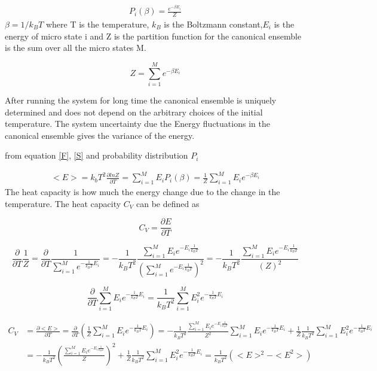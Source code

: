 \documentclass[10pt,a4paper]{article}
\begin{document}
\begin{align}
P_i (\beta) =\frac{ e^{- \beta E_i}}{Z}
\end{align} 
$\beta = 1/k_B T$ where T is the temperature, $k_B$ is the Boltzmann constant,$E_i$ is the energy of micro state i and Z is the partition function for the canonical ensemble is the sum over all the micro states M.

\begin{equation}
  Z=\sum_{i=1}^{M}e^{- \beta E_i}
\end{equation}
   
After running the system for long time the canonical ensemble is uniquely determined and does not depend on the arbitrary choices of the initial temperature.
The system uncertainty due the Energy fluctuations in the canonical ensemble gives the variance of the energy.\\
 


\centerline{ from equation \ref{F}, \ref{S} and probability distribution $P_i$ }
\begin{align}
<E> = k_b T^2 \frac{\partial lnZ}{\partial T}=\sum_{i=1}^{M} E_iP_i(\beta)=\frac{1}{Z }\sum_{i=1}^{M}E_i e ^{ - \beta E_i}
\end{align}
The heat capacity is how much the energy change due to the change in the temperature. The heat capacity $C_V$ can be defined as

\begin{equation}
C_V =\frac{\partial E}{\partial T} 
\end{equation}

\begin{equation}
\frac{\partial}{\partial T}\frac{1}{Z} = \frac{\partial}{\partial T}\frac{1}{\sum_{i=1}^{M}e^{- \frac{1}{k_BT} E_i}} = -\frac{1}{k_B T^2 } \frac{\sum_{i=1}^{M} E_i e^{-E_i \frac{1}{k_BT}}}{\left(\sum_{i=1}^{M} e^{-E_i \frac{1}{k_BT}} \right)^2}=-\frac{1}{k_B T^2 } \frac{\sum_{i=1}^{M} E_i e^{-E_i \frac{1}{k_BT}}}{\left( Z\right)^2}
\end{equation}

\begin{equation}
\frac{\partial}{\partial T}\sum_{i=1}^{M}E_i e ^{ - \frac {1}{k_BT} E_i} = \frac{1}{k_BT^2}\sum_{i=1}^{M}E_i^2 e ^{ - \frac {1}{k_BT} E_i}
\end{equation}

\begin{align}
C_V &=\frac{\partial <E>}{\partial T} = \frac{\partial}{\partial T} \left( \frac{1}{Z }\sum_{i=1}^{M}E_i e ^{ - \frac {1}{k_BT} E_i}\right) = -\frac{1}{k_B T^2 } \frac{\sum_{i=1}^{M} E_i e^{-E_i \frac{1}{k_BT}}}{ Z^2}\sum_{i=1}^{M}E_i e ^{ - \frac {1}{k_BT} E_i} +\frac{1}{Z}\frac{1}{k_BT^2}\sum_{i=1}^{M}E_i^2 e ^{ - \frac {1}{k_BT} E_i} \\
 &= -\frac{1}{k_B T^2 } \left( \frac{\sum_{i=1}^{M} E_i e^{-E_i \frac{1}{k_BT}}}{ Z} \right)^2 +\frac{1}{Z}\frac{1}{k_BT^2}\sum_{i=1}^{M}E_i^2 e ^{ - \frac {1}{k_BT} E_i} = \frac{1}{k_B T^2 } \left( <E>^2 - <E^2> \right)
\end{align}
\end{document}
